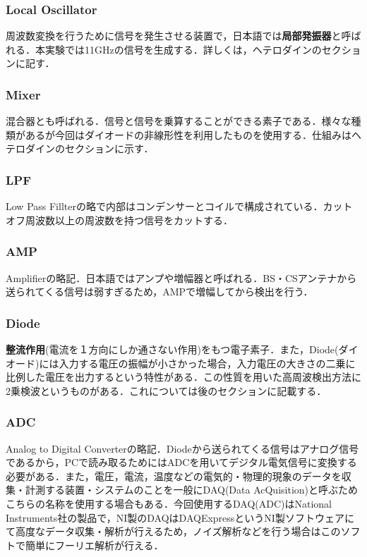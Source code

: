 \documentclass[a4j,10pt,oneside,openany]{jsbook}
\begin{document}
{\subsubsection{Local Oscillator}
周波数変換を行うために信号を発生させる装置で，日本語では\textbf{局部発振器}と呼ばれる．本実験では11GHzの信号を生成する．詳しくは，ヘテロダインのセクションに記す．

\subsubsection{Mixer}
混合器とも呼ばれる．信号と信号を乗算することができる素子である．様々な種類があるが今回はダイオードの非線形性を利用したものを使用する．仕組みはヘテロダインのセクションに示す．

\subsubsection{LPF}
Low Pass Fillterの略で内部はコンデンサーとコイルで構成されている．カットオフ周波数以上の周波数を持つ信号をカットする．

\subsubsection{AMP}
Amplifierの略記．日本語ではアンプや増幅器と呼ばれる．BS・CSアンテナから送られてくる信号は弱すぎるため，AMPで増幅してから検出を行う．

\subsubsection{Diode}
\textbf{整流作用}(電流を１方向にしか通さない作用)をもつ電子素子．また，Diode(ダイオード)には入力する電圧の振幅が小さかった場合，入力電圧の大きさの二乗に比例した電圧を出力するという特性がある．この性質を用いた高周波検出方法に2乗検波というものがある．これについては後のセクションに記載する．

\subsubsection{ADC}
Analog to Digital Converterの略記．Diodeから送られてくる信号はアナログ信号であるから，PCで読み取るためにはADCを用いてデジタル電気信号に変換する必要がある．また，電圧，電流，温度などの電気的・物理的現象のデータを収集・計測する装置・システムのことを一般にDAQ(Data AcQuisition)と呼ぶためこちらの名称を使用する場合もある．今回使用するDAQ(ADC)はNational Instruments社の製品で，NI製のDAQはDAQExpressというNI製ソフトウェアにて高度なデータ収集・解析が行えるため，ノイズ解析などを行う場合はこのソフトで簡単にフーリエ解析が行える．

}
\end{document}
